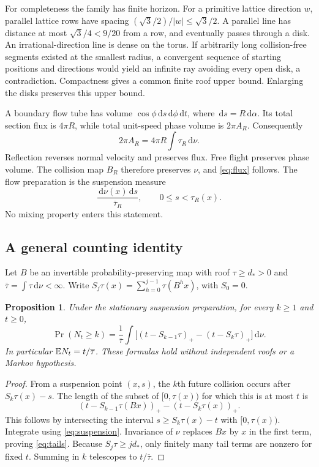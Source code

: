 \documentclass[11pt,reqno]{amsart}
\numberwithin{equation}{section}
\newtheorem{proposition}[theorem]{Proposition}
\theoremstyle{remark}\newtheorem{remark}[theorem]{Remark}
\newcommand{\dd}{\,\mathrm d}\newcommand{\one}{\mathbf1}\newcommand{\T}{\mathbb T}
\begin{document}
For completeness the family has finite horizon. For a primitive lattice direction $w$, parallel lattice rows have spacing $(\sqrt3/2)/|w|\le\sqrt3/2$. A parallel line has distance at most $\sqrt3/4<9/20$ from a row, and eventually passes through a disk. An irrational-direction line is dense on the torus. If arbitrarily long collision-free segments existed at the smallest radius, a convergent sequence of starting positions and directions would yield an infinite ray avoiding every open disk, a contradiction. Compactness gives a common finite roof upper bound. Enlarging the disks preserves this upper bound.

A boundary flow tube has volume $\cos\phi\dd s\dd\phi\dd t$, where $\dd s=R\dd\alpha$. Its total section flux is $4\pi R$, while total unit-speed phase volume is $2\pi A_R$. Consequently
\[
 2\pi A_R=4\pi R\int\tau_R\dd\nu.
\]
Reflection reverses normal velocity and preserves flux. Free flight preserves phase volume. The collision map $B_R$ therefore preserves $\nu$, and \eqref{eq:flux} follows. The flow preparation is the suspension measure
\begin{equation}\label{eq:suspension}
 \frac{\dd\nu(x)\dd s}{\overline\tau_R},\qquad 0\le s<\tau_R(x).
\end{equation}
No mixing property enters this statement.

\subsection{A general counting identity}
Let $B$ be an invertible probability-preserving map with roof $\tau\ge d_*>0$ and $\overline\tau=\int\tau\dd\nu<\infty$. Write $S_j\tau(x)=\sum_{h=0}^{j-1}\tau(B^hx)$, with $S_0=0$.
\begin{proposition}\label{prop:tails}
Under the stationary suspension preparation, for every $k\ge1$ and $t\ge0$,
\begin{equation}\label{eq:tails}
 \Pr(N_t\ge k)=\frac1{\overline\tau}\int
 \bigl[(t-S_{k-1}\tau)_+-(t-S_k\tau)_+\bigr]\dd\nu.
\end{equation}
In particular $\mathbb E N_t=t/\overline\tau$. These formulas hold without independent roofs or a Markov hypothesis.
\end{proposition}
\begin{proof}
From a suspension point $(x,s)$, the $k$th future collision occurs after
$S_k\tau(x)-s$. The length of the subset of $[0,\tau(x))$ for which this is at most $t$ is
\[
 (t-S_{k-1}\tau(Bx))_+-(t-S_k\tau(x))_+.
\]
This follows by intersecting the interval $s\ge S_k\tau(x)-t$ with $[0,\tau(x))$. Integrate using \eqref{eq:suspension}. Invariance of $\nu$ replaces $Bx$ by $x$ in the first term, proving \eqref{eq:tails}. Because $S_j\tau\ge jd_*$, only finitely many tail terms are nonzero for fixed $t$. Summing in $k$ telescopes to $t/\overline\tau$.
\end{proof}
\end{document}
